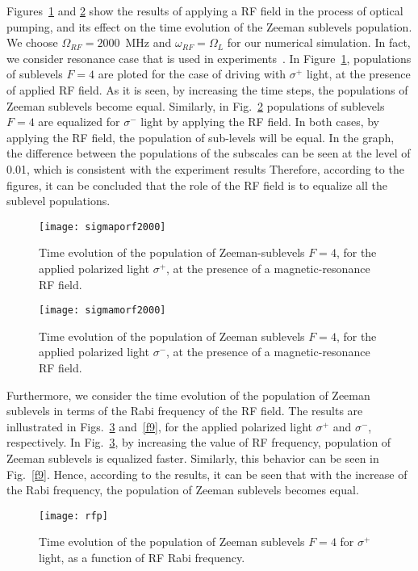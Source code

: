 \documentclass[a4paper]{article}
\begin{document}
Figures~\ref{f6} and \ref{f7} show the results of applying a RF field in the process of optical pumping, and its effect on the time evolution of the Zeeman sublevels population. We choose $\Omega_{RF}=2000$~MHz and $\omega_{RF}=\Omega_L$ for our numerical simulation. In fact, we consider resonance case that is used in experiments~\cite{r23,r25,r24}.  In Figure~\ref{f6}, populations of sublevels $F=4$ are ploted for the case of driving with $\sigma^+$ light, at the presence of applied RF field. As it is seen, by increasing the time steps, the populations of Zeeman sublevels become equal. 
Similarly, in Fig.~\ref{f7} populations of sublevels $F=4$ are equalized for $\sigma^-$ light by applying the RF field.
In both cases, by applying the RF field, the population of sub-levels will be equal. In the graph, the difference between the populations of the subscales can be seen at the level of 0.01, which is consistent with the experiment results
Therefore, according to the figures, it can be concluded that the role of the RF field is to equalize all the sublevel populations.
\begin{figure}[h!]
\centering
\texttt{[image: sigmaporf2000]}
\caption{Time evolution of the population of Zeeman-sublevels $F=4$, for the applied polarized light $\sigma^+$, at the presence of a magnetic-resonance RF field. }\label{f6}
\end{figure}
\begin{figure}[h!]
\centering
\texttt{[image: sigmamorf2000]}
\caption{Time evolution of the population of Zeeman sublevels $F=4$, for the applied polarized light $\sigma^-$, at the presence of a magnetic-resonance RF field.}\label{f7}
\end{figure}
Furthermore, we consider the time evolution of the population of Zeeman sublevels in terms of the Rabi frequency of the RF field. The results are inllustrated in Figs.~\ref{f8} and~\ref{f9}, for the applied polarized light $\sigma^+$ and  $\sigma^-$, respectively.
In Fig.~\ref{f8}, by increasing the value of RF frequency,  population of Zeeman sublevels is equalized faster. Similarly, this behavior can be seen in Fig.~\ref{f9}. 
Hence, according to the results, it can be seen that with the increase of the Rabi frequency, the population of Zeeman sublevels becomes equal.
\begin{figure}[h!]
\centering
\texttt{[image: rfp]}
\caption{Time evolution of the population of Zeeman sublevels $F=4$ for $\sigma^+$ light, as a function of RF Rabi frequency.}\label{f8}
\end{figure}
\end{document}
